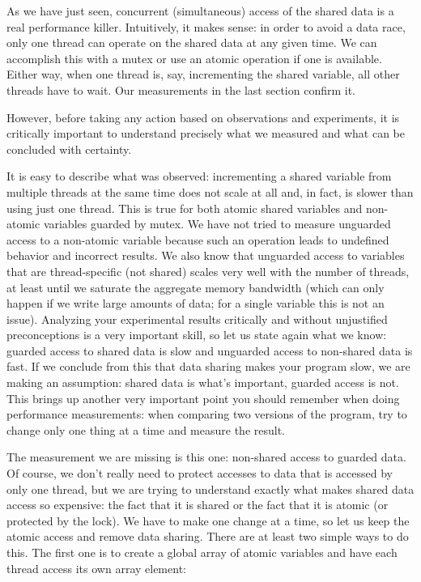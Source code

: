 As we have just seen, concurrent (simultaneous) access of the shared data is a real performance killer. Intuitively, it makes sense: in order to avoid a data race, only one thread can operate on the shared data at any given time. We can accomplish this with a mutex or use an atomic operation if one is available. Either way, when one thread is, say, incrementing the shared variable, all other threads have to wait. Our measurements in the last section confirm it.

However, before taking any action based on observations and experiments, it is critically important to understand precisely what we measured and what can be concluded with certainty.

It is easy to describe what was observed: incrementing a shared variable from multiple threads at the same time does not scale at all and, in fact, is slower than using just one thread. This is true for both atomic shared variables and non-atomic variables guarded by mutex. We have not tried to measure unguarded access to a non-atomic variable because such an operation leads to undefined behavior and incorrect results. We also know that unguarded access to variables that are thread-specific (not shared) scales very well with the number of threads, at least until we saturate the aggregate memory bandwidth (which can only happen if we write large amounts of data; for a single variable this is not an issue). Analyzing your experimental results critically and without unjustified preconceptions is a very important skill, so let us state again what we know: guarded access to shared data is slow and unguarded access to non-shared data is fast. If we conclude from this that data sharing makes your program slow, we are making an assumption: shared data is what's important, guarded access is not. This brings up another very important point you should remember when doing performance measurements: when comparing two versions of the program, try to change only one thing at a time and measure the result.

The measurement we are missing is this one: non-shared access to guarded data. Of course, we don't really need to protect accesses to data that is accessed by only one thread, but we are trying to understand exactly what makes shared data access so expensive: the fact that it is shared or the fact that it is atomic (or protected by the lock). We have to make one change at a time, so let us keep the atomic access and remove data sharing. There are at least two simple ways to do this. The first one is to create a global array of atomic variables and have each thread access its own array element:

